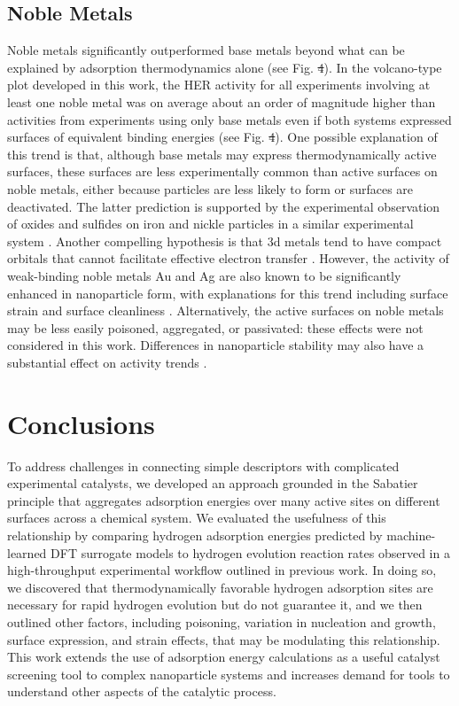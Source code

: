 \documentclass[preprint,12pt]{elsarticle}
\providecommand{\DIFadd}[1]{{\protect\color{blue}\uwave{#1}}} %
\providecommand{\DIFdel}[1]{{\protect\color{red}\sout{#1}}}                      %
\providecommand{\DIFaddbegin}{} %
\providecommand{\DIFaddend}{} %
\providecommand{\DIFdelbegin}{} %
\providecommand{\DIFdelend}{} %
\newcommand{\DIFscaledelfig}{0.5}
\newlength{\DIFdelgraphicswidth} %
\newlength{\DIFdelgraphicsheight} %
\newcommand{\DIFaddincludegraphics}[2][]{{\color{blue}\fbox{\DIFOincludegraphics[#1]{#2}}}} %
\newcommand{\DIFdelincludegraphics}[2][]{%
\sbox{\DIFdelgraphicsbox}{\DIFOincludegraphics[#1]{#2}}%
\settoboxwidth{\DIFdelgraphicswidth}{\DIFdelgraphicsbox} %
\settoboxtotalheight{\DIFdelgraphicsheight}{\DIFdelgraphicsbox} %
\scalebox{\DIFscaledelfig}{%
\parbox[b]{\DIFdelgraphicswidth}{\usebox{\DIFdelgraphicsbox}\\[-\baselineskip] \rule{\DIFdelgraphicswidth}{0em}}\llap{\resizebox{\DIFdelgraphicswidth}{\DIFdelgraphicsheight}{%
\setlength{\unitlength}{\DIFdelgraphicswidth}%
\begin{picture}(1,1)%
\thicklines\linethickness{2pt} %
{\color[rgb]{1,0,0}\put(0,0){\framebox(1,1){}}}%
{\color[rgb]{1,0,0}\put(0,0){\line( 1,1){1}}}%
{\color[rgb]{1,0,0}\put(0,1){\line(1,-1){1}}}%
\end{picture}%
}\hspace*{3pt}}} %
} %
\DeclareRobustCommand{\DIFaddbegin}{\DIFOaddbegin \let\includegraphics\DIFaddincludegraphics} %
\DeclareRobustCommand{\DIFaddend}{\DIFOaddend \let\includegraphics\DIFOincludegraphics} %
\DeclareRobustCommand{\DIFdelbegin}{\DIFOdelbegin \let\includegraphics\DIFdelincludegraphics} %
\DeclareRobustCommand{\DIFdelend}{\DIFOaddend \let\includegraphics\DIFOincludegraphics} %
\begin{document}
\subsection{Noble Metals}\label{Section:Results/Noble}
Noble metals significantly outperformed base metals beyond what can be explained by adsorption thermodynamics alone (see Fig. \DIFdelbegin \DIFdel{4}\DIFdelend \DIFaddbegin \DIFadd{\ref{figure_4}}\DIFaddend ). In the volcano-type plot developed in this work, the HER activity for all experiments involving at least one noble metal was on average about an order of magnitude higher than activities from experiments using only base metals even if both systems expressed surfaces of equivalent binding energies (see Fig. \DIFdelbegin \DIFdel{4}\DIFdelend \DIFaddbegin \DIFadd{\ref{figure_4}}\DIFaddend ). One possible explanation of this trend is that, although base metals may express thermodynamically active surfaces, these surfaces are less experimentally common than active surfaces on noble metals, either because particles are less likely to form or surfaces are deactivated. The latter prediction is supported by the experimental observation of oxides and sulfides on iron and nickle particles in a similar experimental system \cite{bhat2022accelerated}. Another compelling hypothesis is that 3d metals tend to have compact orbitals that cannot facilitate effective electron transfer \cite{quaino2014volcano}. However, the activity of weak-binding noble metals Au and Ag are also known to be significantly enhanced in nanoparticle form, with explanations for this trend including surface strain and surface cleanliness \cite{tran2018gold,campbell2009hydrogen,amin2014situ,merga2010naked,falsig2008trends}. Alternatively, the active surfaces on noble metals may be less easily poisoned, aggregated, or passivated: these effects were not considered in this work. Differences in nanoparticle stability may also have a substantial effect on activity trends \cite{simon2022ligand}.


\section{Conclusions}\label{Section:Conclusions}
To address challenges in connecting simple descriptors with complicated experimental catalysts, we developed an approach grounded in the Sabatier principle that aggregates adsorption energies over many active sites on different surfaces across a chemical system. We evaluated the usefulness of this relationship by comparing hydrogen adsorption energies predicted by machine-learned DFT surrogate models to hydrogen evolution reaction rates observed in a high-throughput experimental workflow outlined in previous work. In doing so, we discovered that thermodynamically favorable hydrogen adsorption sites are necessary for rapid hydrogen evolution but do not guarantee it, and we then outlined other factors, including poisoning, variation in nucleation and growth, surface expression, and strain effects, that may be modulating this relationship. This work extends the use of adsorption energy calculations as a useful catalyst screening tool to complex nanoparticle systems and increases demand for tools to understand other aspects of the catalytic process.
\end{document}
